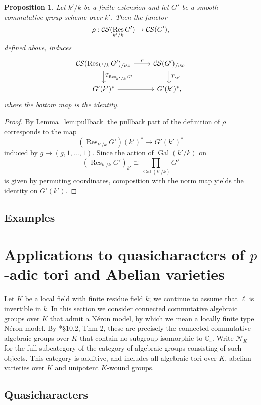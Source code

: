 \documentclass[10pt]{amsart}
\theoremstyle{plain}
\newtheorem{proposition}[theorem]{Proposition}
\theoremstyle{definition}
\theoremstyle{remark}
\newcommand{\Fq}{k}
\DeclareMathOperator{\Gal}{Gal}
\DeclareMathOperator{\Res}{Res}
\newcommand{\TrFrob}[1]{T_{#1}}
\newcommand{\CS}{{\mathcal{C\hskip-0.8pt S}}}
\newcommand{\CSiso}[1]{\CS(#1)_{/\text{iso}}}
\begin{document}
\begin{proposition}
Let $k'/k$ be a finite extension and let $G'$ be a smooth commutative group scheme over $k'$.
Then the functor 
\[
\rho : \CS(\Res_{k'/k}G') \to \CS(G'),
\]
defined above, induces
\[
\begin{tikzcd}
\CSiso{\Res_{k'/k} G'} \dar{\TrFrob{\Res_{k'/k} G'}} \rar{\rho} & \CSiso{G'} \dar{\TrFrob{G'}}\\
G'(k')^* \rar & G'(k')^*,
\end{tikzcd}
\]
where the bottom map is the identity.
\end{proposition}
\begin{proof}
By Lemma~\ref{lem:pullback} the pullback part of the definition of $\rho$ corresponds to the map
\[
(\Res_{k'/k}G')(k')^* \to G'(k')^*
\]
induced by $g \mapsto (g, 1, \ldots, 1)$.  Since the action of $\Gal(k'/k)$ on
\[
(\Res_{k'/k}G')_{k'} \cong \prod_{\Gal(k'/k)} G'
\]
is given by permuting coordinates, composition with the norm map yields the identity on $G'(k')$.
\end{proof}

\subsection{Examples}


\section{Applications to quasicharacters of $p$-adic tori and Abelian varieties}\label{sec:applications}

Let $K$ be a local field with finite residue field $\Fq$;
 we continue to assume that $\ell$ is invertible in $\Fq$.
In this section we consider connected commutative algebraic groups over $K$ that admit a N\'eron model, by which we mean a locally finite type N\'eron model.
By \cite{bosch-lutkebohmert-reynaud:NeronModels}*{\S 10.2, Thm 2}, these are precisely the connected commutative algebraic groups over $K$ that contain no subgroup isomorphic to $\mathbb{G}_\text{a}$.
Write $\mathcal{N}_K$ for the full subcategory of the category of algebraic groups consisting of such objects.  This category is additive, and includes all algebraic tori over $K$, abelian varieties over $K$ and unipotent $K$-wound groups.

\subsection{Quasicharacters}\label{ssec:quasicharacters}
\end{document}
